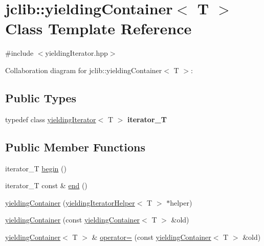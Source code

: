 \hypertarget{classjclib_1_1yieldingContainer}{}\section{jclib\+:\+:yielding\+Container$<$ T $>$ Class Template Reference}
\label{classjclib_1_1yieldingContainer}


{\ttfamily \#include $<$yielding\+Iterator.\+hpp$>$}



Collaboration diagram for jclib\+:\+:yielding\+Container$<$ T $>$\+:
\subsection*{Public Types}
\begin{DoxyCompactItemize}
\item 
\mbox{\label{classjclib_1_1yieldingContainer_a751a0001e4d6e026080ad542f38f7870}} 
typedef class \hyperlink{classjclib_1_1yieldingIterator}{yielding\+Iterator}$<$ T $>$ {\bfseries iterator\+\_\+T}
\end{DoxyCompactItemize}
\subsection*{Public Member Functions}
\begin{DoxyCompactItemize}
\item 
iterator\+\_\+T \hyperlink{classjclib_1_1yieldingContainer_a9cdbb83859db191572b78264821c5d3b}{begin} ()
\item 
iterator\+\_\+T const  \& \hyperlink{classjclib_1_1yieldingContainer_a19f48736c18c516ad711db0255d1894a}{end} ()
\item 
\hyperlink{classjclib_1_1yieldingContainer_a2be1354629759fbe753a23361ddff48b}{yielding\+Container} (\hyperlink{classjclib_1_1yieldingIteratorHelper}{yielding\+Iterator\+Helper}$<$ T $>$ $\ast$helper)
\item 
\hyperlink{classjclib_1_1yieldingContainer_a63e99537ac3eda23b731bcca7c4ec7a7}{yielding\+Container} (const \hyperlink{classjclib_1_1yieldingContainer}{yielding\+Container}$<$ T $>$ \&old)
\item 
\hyperlink{classjclib_1_1yieldingContainer}{yielding\+Container}$<$ T $>$ \& \hyperlink{classjclib_1_1yieldingContainer_a1c4bd31066ec29559dc7ed6d0801cabe}{operator=} (const \hyperlink{classjclib_1_1yieldingContainer}{yielding\+Container}$<$ T $>$ \&old)
\end{DoxyCompactItemize}
